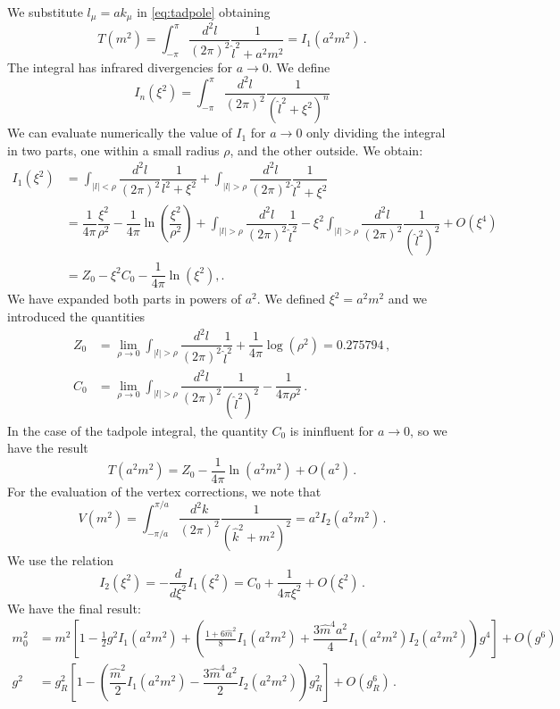 \documentclass[12pt,a4paper]{report}
\begin{document}
 We substitute $l_\mu = a k_\mu$ in \eqref{eq:tadpole} obtaining \begin{equation}
 T( m^2) =  \int_{-\pi}^\pi \dfrac{d^2l}{(2 \pi)^2}\dfrac{1}{\hat l^2 + a^2m^2} =  I_1(a^2 m^2) \,.
 \end{equation} The integral has infrared divergencies for $a \to 0$. We define \begin{equation}
 I_n(\xi^2) = \int_{-\pi}^\pi \dfrac{d^2l}{(2 \pi)^2}\dfrac{1}{(\hat l^2 + \xi^2)^n}
\end{equation}  We can evaluate numerically the value of $I_1$ for $a\to 0$ only dividing the integral in two parts, one within a small radius $\rho$, and the other outside.
 We obtain:
 \begin{align}
 I_1(\xi^2) &= \int_{|l|< \rho} \dfrac{d^2l}{(2 \pi)^2} \dfrac{1}{l^2 + \xi^2} +\int_{|l|> \rho} \dfrac{d^2l}{(2 \pi)^2} \dfrac{1}{\hat l^2 + \xi^2}  \\
 &= \dfrac{1}{4 \pi} \dfrac{\xi^2}{\rho^2} - \dfrac{1}{4 \pi} \ln \left( \dfrac{\xi^2}{\rho^2}\right) + \int_{|l|> \rho} \dfrac{d^2l}{(2 \pi)^2} \dfrac{1}{\hat l^2 } - \xi^2 \int_{|l|> \rho} \dfrac{d^2l}{(2 \pi)^2} \dfrac{1}{(\hat l^2)^2}  +O(\xi^4) \nonumber \\
 &= Z_0 -\xi^2 C_0 -\dfrac{1}{4 \pi} \ln(\xi^2) ,. \nonumber
 \end{align} We have expanded both parts in powers of $a^2$. We defined $\xi^2 = a^2 m^2$ and we introduced the quantities
\begin{align}
Z_0 &= \lim_{\rho \to 0} \int_{|l|> \rho}  \dfrac{d^2l}{(2 \pi)^2} \dfrac{1}{\hat l^2 } + \dfrac{1}{4 \pi} \log(\rho^2)=0.275794 \,, \\
C_0 &= \lim_{\rho \to 0}  \int_{|l|> \rho}  \dfrac{d^2l}{(2 \pi)^2} \dfrac{1}{(\hat l^2)^2 } - \dfrac{1}{4 \pi \rho^2} \,.
\end{align} In the case of the tadpole integral, the quantity $C_0$ is ininfluent for $a\to 0$, so we have the result \begin{equation}
T(a^2 m^2)= Z_0 - \dfrac{1}{4 \pi} \ln(a^2m^2) +O(a^2) \,.
\end{equation} For the evaluation of the vertex corrections, we note that \begin{equation}
V(m^2) = \int_{-\pi/a}^{\pi/a} \dfrac{d^2k}{(2 \pi)^2}\dfrac{1}{(\hat k^2 + m^2)^2} = a^2 I_2(a^2 m^2) \,.
\end{equation} We use the relation \begin{equation}
I_2(\xi^2) = - \dfrac{d}{d\xi^2} I_1(\xi^2) = C_0 + \dfrac{1}{4 \pi \xi^2} + O(\xi^2) \,.
\end{equation} We have the final result: \begin{align}
  m_0^2 &=  m^2\left[1 - \frac{1}{2}g^2 I_1( a^2 m^2) + \left(\frac{1 + 6 \hat m^2}{8} I_1(a^2m^2) + \dfrac{3\hat m^4a^2}{4}I_1(a^2m^2)I_2(a^2m^2)  \right) g^4 \right] + O( g^6 ) \\
g^2 &= g_R^2\left[1- \left( \dfrac{\hat  m^2}{2}I_1(a^2 m^2) - \dfrac{3 \hat m^4a^2}{2} I_2(a^2m^2) \right)g_R^2 \right] + O(g_R^6) \,.
\end{align}
 
\end{document}
